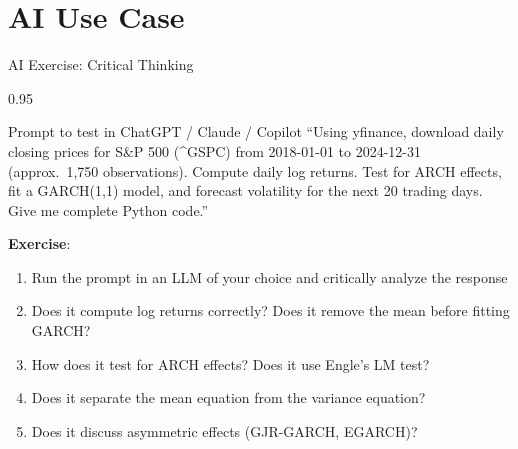 \documentclass[9pt, aspectratio=169, t]{beamer}
\begin{document}

\section{AI Use Case}

\begin{frame}{AI Exercise: Critical Thinking}
    \begin{cminipage}{0.95\textwidth}
        \vspace{-3mm}
        \begin{block}{\footnotesize Prompt to test in ChatGPT / Claude / Copilot}
            {\footnotesize
            ``Using yfinance, download daily closing prices for S\&P 500 (\^{}GSPC) from 2018-01-01 to 2024-12-31 (approx.\ 1{,}750 observations). Compute daily log returns. Test for ARCH effects, fit a GARCH(1,1) model, and forecast volatility for the next 20 trading days. Give me complete Python code.''
            }
        \end{block}
        \vspace{-2mm}
        {\footnotesize
        \textbf{Exercise}:
        \begin{enumerate}\setlength{\itemsep}{0pt}
            \item Run the prompt in an LLM of your choice and critically analyze the response
            \item Does it compute log returns correctly? Does it remove the mean before fitting GARCH?
            \item How does it test for ARCH effects? Does it use Engle's LM test?
            \item Does it separate the mean equation from the variance equation?
            \item Does it discuss asymmetric effects (GJR-GARCH, EGARCH)?
        \end{enumerate}
        }
    \end{cminipage}
\end{frame}
\end{document}
